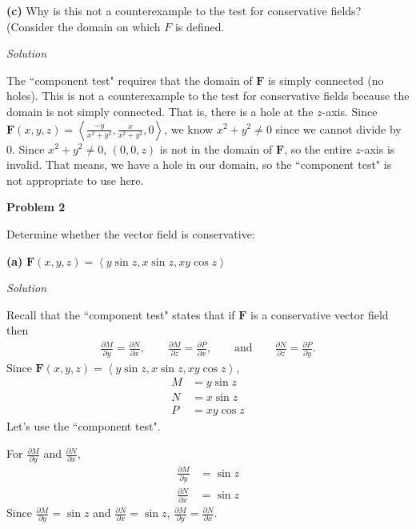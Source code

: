 \documentclass{article}
\newcommand{\lra}[1]{\left\langle #1 \right\rangle}
\newcommand{\F}[0]{\mathbf{F}}
\newcommand{\Solution}{\textit{Solution}}
\begin{document}
{}\textbf{(c)} Why is this not a counterexample to the test for conservative fields? (Consider the domain on which $F$ is defined.

\Solution

 The ``component test" requires that the domain of $\F$ is simply connected (no holes). This is not a counterexample to the test for conservative fields because the domain is not simply connected. That is, there is a hole at the $z$-axis. Since $\displaystyle \F(x,y,z)=\lra{\frac{-y}{x^2+y^2},\frac{x}{x^2+y^2},0}$, we know $x^2+y^2\neq 0$ since we cannot divide by $0$. Since $x^2+y^2\neq 0$, $(0,0,z)$ is not in the domain of $\F$, so the entire $z$-axis is invalid. That means, we have a hole in our domain, so the ``component test" is not appropriate to use here.

{}\textbf{Problem 2}

Determine whether the vector field is conservative:

{}\textbf{(a)} $\F(x,y,z)=\lra{y\sin z, x\sin z, xy\cos z}$

\Solution

Recall that the ``component test" states that if $\F$ is a conservative vector field then
\begin{align*}
    \frac{\partial M}{\partial y}=\frac{\partial N}{\partial x},\hspace{2em}\frac{\partial M}{\partial z}=\frac{\partial P}{\partial x},\hspace{2em} \text{and}\hspace{2em}\frac{\partial N}{\partial z}=\frac{\partial P}{\partial y}.
\end{align*}
Since $\displaystyle\F(x,y,z)=\lra{y\sin z, x\sin z, xy\cos z}$, \begin{align*}
    M&=y\sin z\\
    N&=x\sin z\\
    P&=xy\cos z
\end{align*}
Let's use the ``component test".

{}
For $\displaystyle \frac{\partial M}{\partial y}$ and $\displaystyle\frac{\partial N}{\partial x}$,
\begin{align*}
    \frac{\partial M}{\partial y}&= \sin z\\
    \frac{\partial N}{\partial x}&=
    \sin z
\end{align*}
Since $\displaystyle \frac{\partial M}{\partial y}=\sin z$ and $\displaystyle\frac{\partial N}{\partial x}=\sin z$, $\displaystyle \frac{\partial M}{\partial y}=\displaystyle\frac{\partial N}{\partial x}$.
\end{document}
